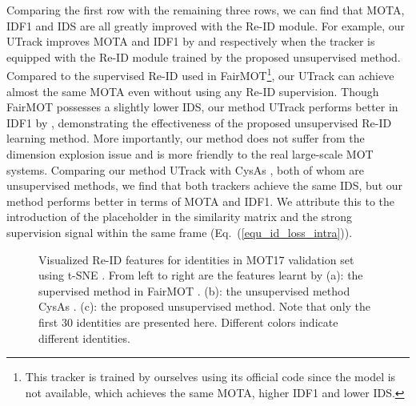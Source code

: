 \documentclass[final,1p,times,twocolumn]{elsarticle}
\newcommand{\eref}[1]{Eq.~(\ref{#1})}
\begin{document}
	
	Comparing the first row with the remaining three rows, we can find that MOTA, IDF1 and IDS are all greatly improved with the Re-ID module. For example, our UTrack improves MOTA and IDF1 by  and  respectively when the tracker is equipped with the Re-ID module trained by the proposed unsupervised method.
	Compared to the supervised Re-ID used in FairMOT\footnote{This tracker is trained by ourselves using its official code since the model is not available, which achieves the same MOTA, higher IDF1 and lower IDS.\label{ourself_trained_fairmot}}, our UTrack can achieve almost the same MOTA even without using any Re-ID supervision. Though FairMOT possesses a slightly lower IDS, our method UTrack performs better in IDF1 by , demonstrating the effectiveness of the proposed unsupervised Re-ID learning method. 
	More importantly, our method does not suffer from the dimension explosion issue and is more friendly to the real large-scale MOT systems.
	Comparing our method UTrack with CysAs \cite{wang2020cycas}, both of whom are unsupervised methods, we find that both trackers achieve the same IDS, but our method performs better in terms of MOTA and IDF1. We attribute this to the introduction of the placeholder in the similarity matrix and the strong supervision signal  within the same frame (\eref{equ_id_loss_intra}).
	
	
	
	\begin{figure*}[t]\centering
		\centering
		\caption{Visualized Re-ID features for identities in MOT17 validation set using t-SNE \cite{maaten2008visualizing}.
			From left to right are the features learnt by
			(a): the supervised method in FairMOT \cite{zhang2020fairmot}. (b): the unsupervised method CysAs  \cite{wang2020cycas}. (c): the proposed unsupervised method. Note that only the first 30 identities are presented here. Different colors indicate different identities.}
		\label{fig_id_feature_tsne}
	\end{figure*}
	
\end{document}
